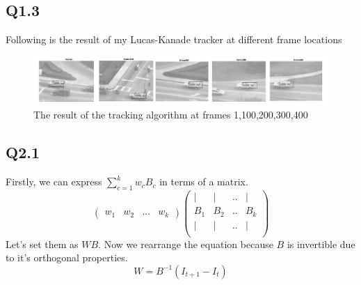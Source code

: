 \documentclass{article}
\begin{document}
\subsection*{Q1.3}
Following is the result of my Lucas-Kanade tracker at different frame locations
\begin{figure}[H]
    \centering
    \includegraphics[width=6.5in]{./figures/fig-1-3-combined}
    \caption{The result of the tracking algorithm at frames 1,100,200,300,400}
\end{figure}
\subsection*{Q2.1}
Firstly, we can express $\sum^{k}_{c=1}w_cB_c$ in terms of a matrix.
\begin{equation*}
\begin{pmatrix}
w_1 & w_2 & ... & w_k
\end{pmatrix}
\begin{pmatrix}
|&|&..&|\\
B_1&B_2&..&B_k\\
|&|&..&|\\
\end{pmatrix}
\end{equation*}
Let's set them as $WB$. Now we rearrange the equation because $B$ is invertible due to it's orthogonal properties.
\begin{equation*}
W = B^{-1}(I_{t+1} - I_{t})
\end{equation*}
\end{document}
